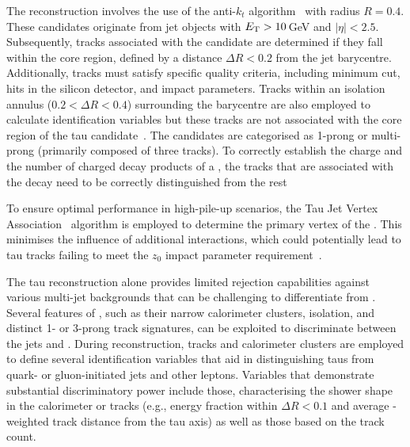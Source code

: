 


The \tauhad reconstruction involves the use of the anti-$k_t$ algorithm~\cite{Cacciari:2008gp}
with radius $R=0.4$. These \tauhad candidates originate from jet objects with $E_{\text{T}} >10\,$GeV and $|\eta|<2.5$. Subsequently,
tracks associated with the candidate are determined if they fall within the core region, defined by
a distance $\Delta R < 0.2$ from the jet barycentre. Additionally, tracks must satisfy specific 
quality criteria, including minimum \pT cut, hits in the silicon detector, and impact parameters.
Tracks within an isolation annulus ($0.2 < \Delta R < 0.4$) surrounding the barycentre are also 
employed to calculate identification variables but these tracks are not associated with the core region of the tau 
candidate~\cite{ATL-PHYS-PUB-2022-044, Leister:1609659}. The \tauhad candidates are categorised as 1-prong 
or multi-prong (primarily composed of three tracks). To correctly establish the charge and the number of charged 
decay products of a \tauhad , the tracks that are
associated with the \tauhad decay need to be correctly distinguished from the rest

To ensure optimal performance in high-pile-up scenarios, the Tau Jet Vertex Association~\cite{ATLAS:2014rzk}
algorithm is employed to determine the primary vertex of the \tauhad. This minimises the
influence of additional interactions, which could potentially lead to tau tracks failing to 
meet the $z_0$ impact parameter requirement~\cite{ATLAS:2012voa}.

The tau reconstruction alone provides limited rejection capabilities against 
various multi-jet backgrounds that can be challenging to differentiate from \tauhad. Several features of \tauhad, 
such as their narrow calorimeter clusters, isolation, and distinct 1- or 3-prong track signatures, 
can be exploited to discriminate between the jets and \tauhad.  During reconstruction, tracks 
and calorimeter clusters are employed to define several identification
variables that aid in distinguishing 
taus from quark- or gluon-initiated jets and other leptons. Variables that demonstrate substantial 
discriminatory power include those, characterising the shower shape in the calorimeter or tracks 
(e.g., energy fraction within $\Delta R < 0.1$ and average \pT-weighted track distance from the
tau axis) as well as those based on the track count.

